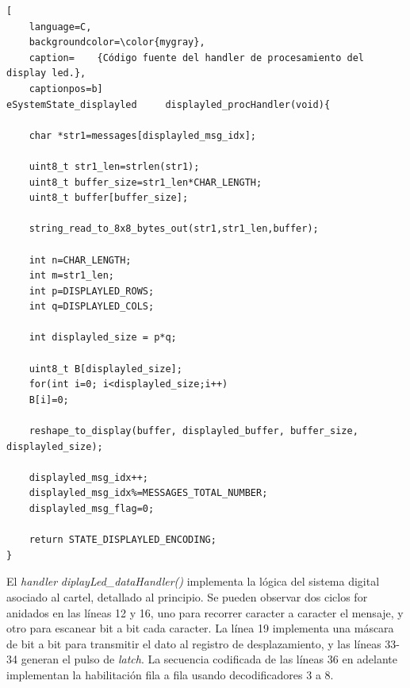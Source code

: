 \begin{lstlisting}[
	language=C, 
	backgroundcolor=\color{mygray},
	caption=	{Código fuente del handler de procesamiento del display led.},
	captionpos=b]
eSystemState_displayled     displayled_procHandler(void){

    char *str1=messages[displayled_msg_idx];

    uint8_t str1_len=strlen(str1);
    uint8_t buffer_size=str1_len*CHAR_LENGTH;
    uint8_t buffer[buffer_size];

    string_read_to_8x8_bytes_out(str1,str1_len,buffer);

    int n=CHAR_LENGTH; 
    int m=str1_len;
    int p=DISPLAYLED_ROWS;
    int q=DISPLAYLED_COLS;

    int displayled_size = p*q;

    uint8_t B[displayled_size];
    for(int i=0; i<displayled_size;i++)
    B[i]=0;

    reshape_to_display(buffer, displayled_buffer, buffer_size, displayled_size);

    displayled_msg_idx++;
    displayled_msg_idx%=MESSAGES_TOTAL_NUMBER;
    displayled_msg_flag=0;

    return STATE_DISPLAYLED_ENCODING;
}

\end{lstlisting}

El \textit{handler} \textit{diplayLed\_dataHandler()} implementa la lógica del sistema digital asociado al cartel, detallado al principio. Se pueden observar dos ciclos for anidados en las líneas 12 y 16, uno para recorrer caracter a caracter el mensaje, y otro para escanear bit a bit cada caracter. La línea 19 implementa una máscara de bit a bit para transmitir el dato al registro de desplazamiento, y las líneas 33-34 generan el pulso de \textit{latch}. La secuencia codificada de las líneas 36 en adelante implementan la habilitación fila a fila usando decodificadores 3 a 8. \\

